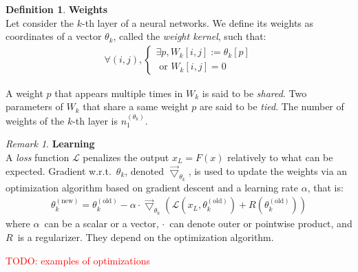 \documentclass{article}
\theoremstyle{definition}
\newtheorem{definition}{Definition}[section]
\theoremstyle{remark}
\newtheorem{remark}{Remark}[section]
\theoremstyle{plain}
\newcommand{\ovec}{}
\newcommand{\todo}[1]{\textcolor{red}{TODO: #1\\}}
\begin{document}
\begin{definition}\textbf{Weights}\\
Let consider the $k$-th layer of a neural networks. We define its weights as coordinates of a vector $\theta_k$, called the \emph{weight kernel}, such that:
\begin{gather*}
  \forall (i,j),
    \begin{cases}
      \exists p, W_k[i,j] := \theta_k[p] \\
      \text{ or } W_k[i,j] = 0
    \end{cases}
\end{gather*}
\end{definition}
A weight $p$ that appears multiple times in $W_k$ is said to be \emph{shared}. Two parameters of $W_k$ that share a same weight $p$ are said to be \emph{tied}. The number of weights of the $k$-th layer is $n_1^{(\theta_k)}$.

\begin{remark}\textbf{Learning}\\
A \emph{loss} function $\mathcal{L}$ penalizes the output $x_L = F(\ovec{x})$ relatively to what can be expected. Gradient w.r.t.~$\theta_k$, denoted $\vec{\bigtriangledown}_{\theta_k}$, is used to update the weights via an optimization algorithm based on gradient descent and a learning rate $\alpha$, that is:
\begin{gather}
\theta_k^{(\text{new})} = \theta_k^{(\text{old})} - \alpha \cdot \vec{\bigtriangledown}_{\theta_k} \left( \mathcal{L}\left( x_L, \theta_k^{(\text{old})} \right) + R\left( \theta_k^{(\text{old})} \right) \right)
\end{gather}
where $\alpha$~can be a scalar or a vector, $\cdot$~can denote outer or pointwise product, and $R$~is a regularizer. They depend on the optimization algorithm.
\end{remark}

\todo{examples of optimizations}
\end{document}
